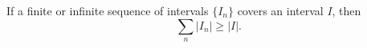 If a finite or infinite sequence of intervals $\{I_n\}$ covers an interval $I$, then
$$\sum_{n} |I_n| \geq |I|.$$
